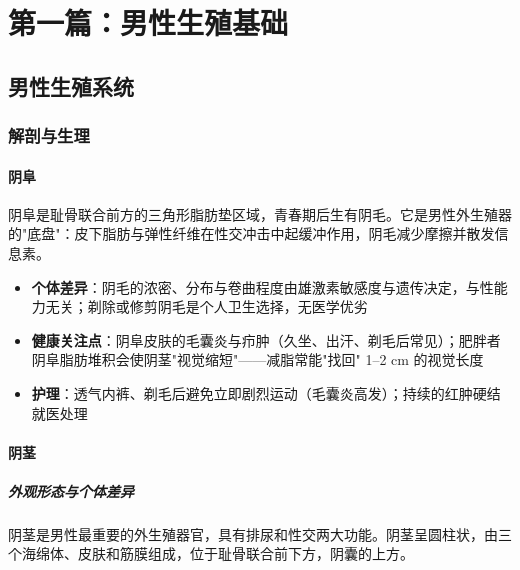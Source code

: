 \newif\ifskipmaleframework
\skipmaleframeworktrue   %

\ifskipmaleframework
\else

\part{第一篇：男性生殖基础}

\chapter{男性生殖系统}

\section{解剖与生理}

\subsection{阴阜}


阴阜是耻骨联合前方的三角形脂肪垫区域，青春期后生有阴毛。它是男性外生殖器的"底盘"：皮下脂肪与弹性纤维在性交冲击中起缓冲作用，阴毛减少摩擦并散发信息素。

\begin{itemize}
	\item \textbf{个体差异}：阴毛的浓密、分布与卷曲程度由雄激素敏感度与遗传决定，与性能力无关；剃除或修剪阴毛是个人卫生选择，无医学优劣
	\item \textbf{健康关注点}：阴阜皮肤的毛囊炎与疖肿（久坐、出汗、剃毛后常见）；肥胖者阴阜脂肪堆积会使阴茎"视觉缩短"——减脂常能"找回" 1--2 cm 的视觉长度
	\item \textbf{护理}：透气内裤、剃毛后避免立即剧烈运动（毛囊炎高发）；持续的红肿硬结就医处理
\end{itemize}


\subsection{阴茎}

\subsubsection{外观形态与个体差异}

阴茎是男性最重要的外生殖器官，具有排尿和性交两大功能。阴茎呈圆柱状，由三个海绵体、皮肤和筋膜组成，位于耻骨联合前下方，阴囊的上方。


